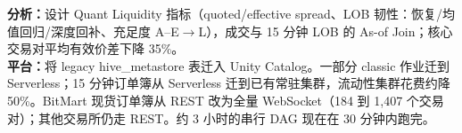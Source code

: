 \documentclass[letterpaper]{deedy-resume}
\renewcommand{\runsubsection}[1]{%
\color{subheadings}\fontsize{12pt}{12pt}\selectfont\bfseries #1\normalfont}
\renewcommand{\descript}[1]{%
\color{subheadings}\raggedright\fontsize{11pt}{13pt}\selectfont {#1 \\}\normalfont}
\renewcommand{\location}[1]{%
\color{headings}\raggedright\fontsize{10pt}{12pt}\selectfont {#1\\}\normalfont}
\begin{document}
\begin{minipage}[t]{0.66\textwidth}
\sectionspace

\runsubsection{}
\descript{高频流动性与有效价差平台}
\location{2025年7月 -- 2026年7月 $|$ BitMart}
\textbf{分析：}设计 Quant Liquidity 指标（quoted/effective spread、LOB 韧性：恢复/均值回归/深度回补、充足度 A--E$\to$L），成交与 15 分钟 LOB 的 As-of Join；核心交易对平均有效价差下降 35\%。 \\
\textbf{平台：}将 legacy hive\_metastore 表迁入 Unity Catalog。一部分 classic 作业迁到 Serverless；15 分钟订单簿从 Serverless 迁到已有常驻集群，流动性集群花费约降 50\%。BitMart 现货订单簿从 REST 改为全量 WebSocket（184 到 1,407 个交易对）；其他交易所仍走 REST。约 3 小时的串行 DAG 现在在 30 分钟内跑完。

\end{minipage}
\end{document}
